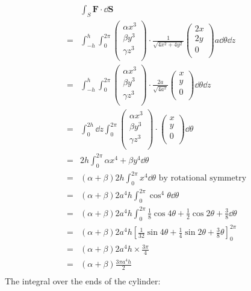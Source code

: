\documentclass[10pt,\jkfside,a4paper]{article}
\begin{document}
\begin{enumerate}
\begin{enumerate}
\[
\begin{split}
 & \int_S \mathbf{F} \cdot \dd{\mathbf{S}} \\
=& \int^{h}_{-h}\int^{2\pi}_0 
\begin{pmatrix}
\alpha x^3 \\ \beta y^3 \\ \gamma z^3 \\
\end{pmatrix} \cdot 
\frac{1}{\sqrt{4x^2 + 4y^2}}
\begin{pmatrix}
2x \\ 2y \\ 0 \\
\end{pmatrix}
a\dd{\theta}\dd{z} \\
=& \int^{h}_{-h}\int^{2\pi}_0 
\begin{pmatrix}
\alpha x^3 \\ \beta y^3 \\ \gamma z^3 \\
\end{pmatrix} \cdot 
\frac{2a}{\sqrt{4a^2}}
\begin{pmatrix}
x \\ y \\ 0 \\
\end{pmatrix}
\dd{\theta}\dd{z} \\
=& \int^{2h}_0\dd{z}\int^{2\pi}_0 
\begin{pmatrix}
\alpha x^3 \\ \beta y^3 \\ \gamma z^3 \\
\end{pmatrix} \cdot 
\begin{pmatrix}
x \\ y \\ 0 \\
\end{pmatrix}
\dd{\theta}\\
=& 2h\int^{2\pi}_0 \alpha x^4 + \beta y^4 \dd{\theta}\\
=& (\alpha + \beta)2h \int^{2\pi}_0 x^4 \dd{\theta} \text{ by rotational symmetry} \\
=& (\alpha + \beta)2a^4h \int^{2\pi}_0 \cos^4\theta \dd{\theta} \\
=& (\alpha + \beta)2a^4h \int^{2\pi}_0 \frac{1}{8}\cos4\theta + \frac{1}{2}\cos2\theta + \frac{3}{8} \dd{\theta} \\
=& (\alpha + \beta)2a^4h \left[ \frac{1}{32}\sin4\theta + \frac{1}{4}\sin2\theta + \frac{3}{8}\theta \right]^{2\pi}_0 \\
=& (\alpha + \beta)2a^4h \times \frac{3\pi}{4} \\
=& (\alpha + \beta)\frac{3\pi a^4h}{2} \\
\end{split}
\]
\newpage
The integral over the ends of the cylinder:


\end{enumerate}
\end{enumerate}
\end{document}
